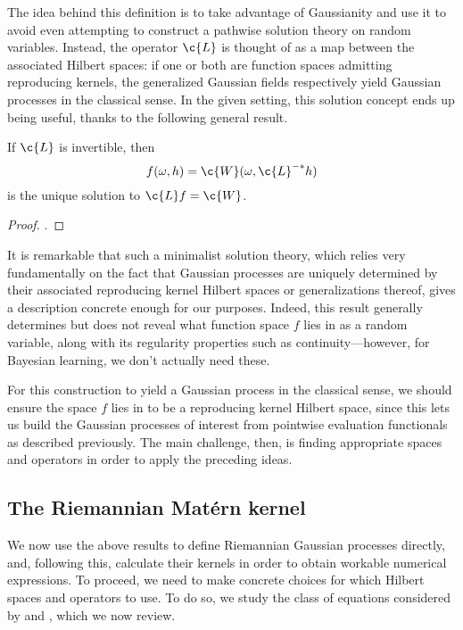 \documentclass[11pt]{book}
\begin{document}
The idea behind this definition is to take advantage of Gaussianity and use it to avoid even attempting to construct a pathwise solution theory on random variables.
Instead, the operator $\c{L}$ is thought of as a map between the associated Hilbert spaces: if one or both are function spaces admitting reproducing kernels, the generalized Gaussian fields respectively yield Gaussian processes in the classical sense.
In the given setting, this solution concept ends up being useful, thanks to the following general result.

\begin{result}
If $\c{L}$ is invertible, then
\[
f(\omega,h) = \c{W}(\omega, \c{L}^{-*} h)
\]
is the unique solution to $\c{L}f = \c{W}$.
\end{result}

\begin{proof}
\textcite[Theorem 4.2.2.]{lototsky17}.
\end{proof}

It is remarkable that such a minimalist solution theory, which relies very fundamentally on the fact that Gaussian processes are uniquely determined by their associated reproducing kernel Hilbert spaces or generalizations thereof, gives a description concrete enough for our purposes.
Indeed, this result generally determines but does not reveal what function space $f$ lies in as a random variable, along with its regularity properties such as continuity---however, for Bayesian learning, we don't actually need these.

For this construction to yield a Gaussian process in the classical sense, we should ensure the space $f$ lies in to be a reproducing kernel Hilbert space, since this lets us build the Gaussian processes of interest from pointwise evaluation functionals as described previously.
The main challenge, then, is finding appropriate spaces and operators in order to apply the preceding ideas.

\subsection{The Riemannian Matérn kernel}

We now use the above results to define Riemannian Gaussian processes directly, and, following this, calculate their kernels in order to obtain workable numerical expressions.
To proceed, we need to make concrete choices for which Hilbert spaces and operators to use.
To do so, we study the class of equations considered by \textcite{whittle63} and \textcite{lindgren11}, which we now review.
\end{document}
